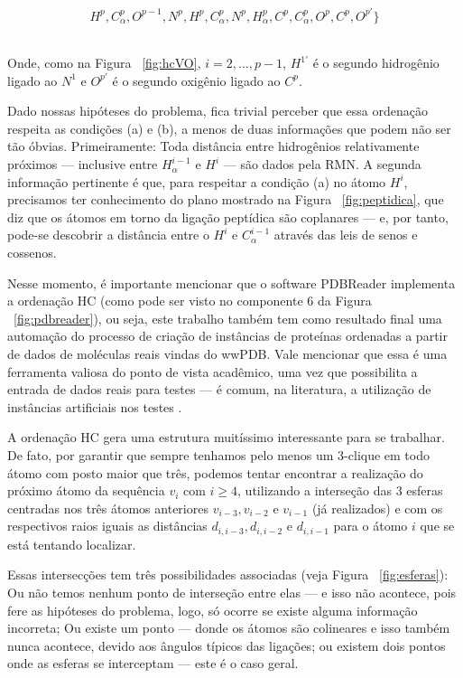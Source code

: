 \documentclass[a4paper,12pt]{article}
\begin{document}
	\hspace{4.5cm}
	\begin{minipage}{0.532\linewidth}
		\vspace{-0.7cm}
		$$
		H^p, C_{\alpha}^p, O^{p-1}, N^p, H^p, C^{p}_\alpha, N^p, H^{p}_\alpha, C^p, C_{\alpha}^p, O^p, C^p, O^{p'}\}
		$$
	\end{minipage}
	\\

	Onde, como na Figura ~\ref{fig:hcVO}, $i = 2, \dots, p-1$, $H^{1'}$ é o segundo hidrogênio ligado ao $N^1$ e $O^{p'}$ é o segundo oxigênio ligado ao $C^p$.
	
	Dado nossas hipóteses do problema, fica trivial perceber que essa ordenação respeita as condições (a) e (b), a menos de duas informações que podem não ser tão óbvias. Primeiramente: Toda distância entre hidrogênios relativamente próximos --- inclusive entre $H_\alpha^{i-1}$ e $H^{i}$ --- são dados pela RMN. A segunda informação pertinente é que, para respeitar a condição (a) no átomo $H^i$, precisamos ter conhecimento do plano mostrado na Figura ~\ref{fig:peptidica}, que diz que os átomos em torno da ligação peptídica são coplanares --- e, por tanto, pode-se descobrir a distância entre o $H^i$ e $C_\alpha^{i-1}$ através das leis de senos e cossenos. 
 	
 	Nesse momento, é importante mencionar que o software PDBReader implementa a ordenação HC (como pode ser visto no componente 6 da Figura ~\ref{fig:pdbreader}), ou seja, este trabalho também tem como resultado final uma automação do processo de criação de instâncias de proteínas ordenadas a partir de dados de moléculas reais vindas do wwPDB. Vale mencionar que essa é uma ferramenta valiosa do ponto de vista acadêmico, uma vez que possibilita a entrada de dados reais para testes --- é comum, na literatura, a utilização de instâncias artificiais nos testes \cite{carlile:BP} \cite{carlile:instancesMDGP}.
 	
 	A ordenação HC gera uma estrutura muitíssimo interessante para se trabalhar. De fato, por garantir que sempre tenhamos pelo menos um 3-clique em todo átomo com posto maior que três, podemos tentar encontrar a realização do próximo átomo da sequência $v_i$ com $i \geq 4$, utilizando a interseção das 3 esferas centradas nos três átomos anteriores $v_{i-3}, v_{i-2}$ e $v_{i-1}$ (já realizados) e com os respectivos raios iguais as distâncias $d_{i,i-3}, d_{i,i-2}$ e $d_{i,i-1}$ para o átomo $i$ que se está tentando localizar. 
 	
 	Essas intersecções tem três possibilidades associadas (veja Figura ~\ref{fig:esferas}): Ou não temos nenhum ponto de interseção entre elas --- e isso não acontece, pois fere as hipóteses do problema, logo, só ocorre se existe alguma informação incorreta; Ou existe um ponto --- donde os átomos são colineares e isso também nunca acontece, devido aos ângulos típicos das ligações; ou existem dois pontos onde as esferas se interceptam --- este é o caso geral.
 	
\end{document}
